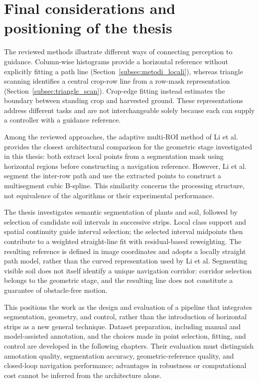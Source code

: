 \section{Final considerations and positioning of the thesis}
\label{sec:considerazioni_finali_stato_arte}

The reviewed methods illustrate different ways of connecting perception
to guidance. Column-wise histograms provide a horizontal reference
without explicitly fitting a path line
(Section~\ref{subsec:metodi_locali}), whereas triangle scanning identifies
a central crop-row line from a row-mask representation
(Section~\ref{subsec:triangle_scan}). Crop-edge fitting instead estimates
the boundary between standing crop and harvested ground. These
representations address different tasks and are not interchangeable
solely because each can supply a controller with a guidance reference.

Among the reviewed approaches, the adaptive multi-ROI method of Li
et al.\ \cite{li2022multiroi} provides the closest architectural comparison
for the geometric stage investigated in this thesis: both extract local
points from a segmentation mask using horizontal regions before
constructing a navigation reference. However, Li et al. segment the
inter-row path and use the extracted points to construct a multisegment
cubic B-spline. This similarity concerns the processing structure,
not equivalence of the algorithms or their experimental performance.

The thesis investigates semantic segmentation of plants and soil,
followed by selection of candidate soil intervals in successive strips.
Local class support and spatial continuity guide interval selection;
the selected interval midpoints then contribute to a weighted
straight-line fit with residual-based reweighting. The resulting
reference is defined in image coordinates and adopts a locally straight
path model, rather than the curved representation used by Li et al.
Segmenting visible soil does not itself identify a unique navigation
corridor: corridor selection belongs to the geometric stage, and the
resulting line does not constitute a guarantee of obstacle-free motion.

This positions the work as the design and evaluation of a pipeline that
integrates segmentation, geometry, and control, rather than the
introduction of horizontal strips as a new general technique. Dataset preparation,
including manual and model-assisted annotation, and the choices made
in point selection, fitting, and control are developed in the following
chapters. Their evaluation must distinguish annotation quality,
segmentation accuracy, geometric-reference quality, and closed-loop
navigation performance; advantages in robustness or computational cost
cannot be inferred from the architecture alone.